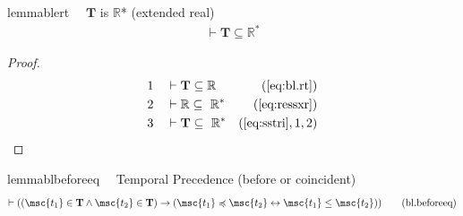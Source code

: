 \begin{restatable}{lemma}{blert}~~ $\mathbf{T}$ is $\mathbb{R}$* (extended
real)
\begin{align}
\vdash \mathbf{T} \subseteq \mathbb{R}^{*}\label{eq:bl.ert}\tag{bl.ert}
\end{align}
\end{restatable}

\begin{proof}
\begin{align}
  1 &&  & \vdash \mathbf{T} \subseteq \mathbb{R}&(\mbox{\ref{eq:bl.rt}})\notag
  \\ 2 &&  & \vdash \mathbb{R} \subseteq
     ~\mathbb{R}^{*}&(\mbox{\ref{eq:ressxr}})\notag
  \\ 3 &&  & \vdash \mathbf{T} \subseteq
     ~\mathbb{R}^{*}&(\mbox{\ref{eq:sstri}},1,2)\notag
\end{align}
\end{proof}

\begin{restatable}{lemma}{blbeforeeq}~~ Temporal Precedence (before or
coincident)
\begin{align}
\vdash ( ( \msc{t_1} \in \mathbf{T} \wedge \msc{t_2} \in \mathbf{T} )
    \rightarrow ( \msc{t_1} \preccurlyeq \msc{t_2} \leftrightarrow \msc{t_1}
    \le \msc{t_2} ) )\label{eq:bl.beforeeq}\tag{bl.beforeeq}
\end{align}
\end{restatable}


